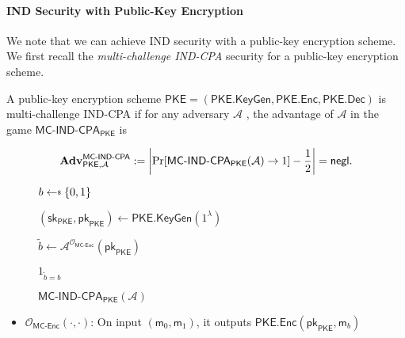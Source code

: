 \paragraph{IND Security with Public-Key Encryption}

We note that we can achieve IND security with a public-key encryption scheme. We first recall the \emph{multi-challenge IND-CPA} security for a public-key encryption scheme.

\begin{definition}

A public-key encryption scheme $\textsf{PKE} = (\textsf{PKE.KeyGen}, \textsf{PKE.Enc}, \textsf{PKE.Dec})$ is multi-challenge IND-CPA if for any adversary $\mathcal{A}$ , the advantage of $\mathcal{A}$ in the game $\textsf{MC-IND-CPA}_{\textsf{PKE}}$ is

\[
	\mathbf{Adv}^{\textsf{MC-IND-CPA}}_{\textsf{PKE}, \mathcal{A}} := \left| \Pr[ \textsf{MC-IND-CPA}_{\textsf{PKE}}(\mathcal{A}) \to 1 ] - \frac{1}{2} \right| = \mathsf{negl}.
\]

\begin{figure}[h]
\centering

	\begin{minipage}[t]{0.6\textwidth}
	\begin{algorithm}[H]
	\caption{$\textsf{MC-IND-CPA}_{\textsf{PKE}} (\mathcal{A})$ }
	\label{alg:ind-tp-fp}
	\begin{algorithmic}[1]
		\State $b \getsdollar \{0, 1\}$

		\State $(\textsf{sk}_{\textsf{PKE}}, \textsf{pk}_{\textsf{PKE}}) \gets \textsf{PKE.KeyGen}(1^\lambda)$
		
		\State $\tilde{b} \gets \mathcal{A}^{\mathcal{O}_{\textsf{MC-Enc}}}(\textsf{pk}_{\textsf{PKE}})$ 
		
		\State \Return $1_{\tilde{b} = b}$
	\end{algorithmic}
	\end{algorithm}
	\end{minipage}

\end{figure}
\end{definition}

\begin{itemize}
	\item $\mathcal{O}_{\textsf{MC-Enc}}(\cdot, \cdot)$: On input $(\textsf{m}_0, \textsf{m}_1)$, it outputs $\textsf{PKE.Enc}(\textsf{pk}_{\textsf{PKE}}, \textsf{m}_b)$
\end{itemize}

